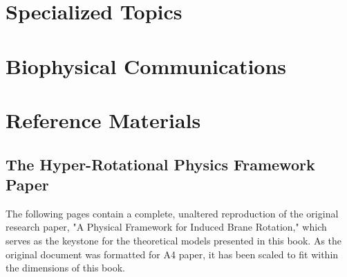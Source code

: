 \documentclass[11pt,twoside,openany]{book}
\begin{document}
\part{Specialized Topics}




\part{Biophysical Communications}












\part{Reference Materials}




\appendix
\chapter{The Hyper-Rotational Physics Framework Paper}

The following pages contain a complete, unaltered reproduction of the original research paper, "A Physical Framework for Induced Brane Rotation," which serves as the keystone for the theoretical models presented in this book. As the original document was formatted for A4 paper, it has been scaled to fit within the dimensions of this book.
\end{document}
